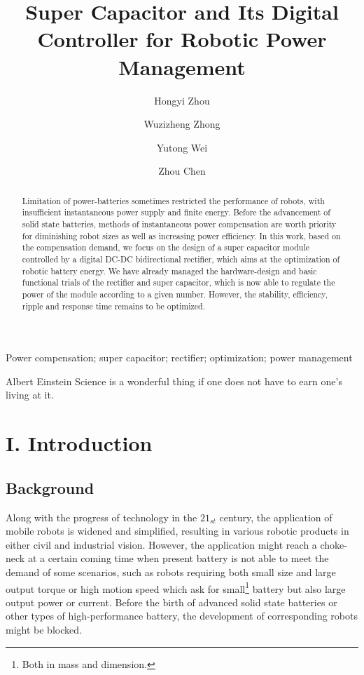 \documentclass[a4paper,num-refs]{oup-contemporary}
\title{Super Capacitor and Its Digital Controller for Robotic Power Management}
\author[1,\authfn{1}]{Hongyi Zhou}
\author[2,\authfn{1}]{Wuzizheng Zhong}
\author[2,\authfn{1}]{Yutong Wei}
\author[2,\authfn{1}]{Zhou Chen}
\affil[1]{Optoelectronic Engineering}
\affil[2]{Cybernetics Engineering}
\begin{document}
\begin{frontmatter}
\maketitle
\begin{abstract}
Limitation of power-batteries sometimes restricted the performance of robots, with insufficient instantaneous power supply and finite energy. Before the advancement of solid state batteries, methods of instantaneous power compensation are worth priority for diminishing robot sizes as well as increasing power efficiency. In this work, based on the compensation demand, we focus on the design of a super capacitor module controlled by a digital DC-DC bidirectional rectifier, which aims at the optimization of robotic battery energy. We have already managed the hardware-design and basic functional trials of the rectifier and super capacitor, which is now able to regulate the power of the module according to a given number. However, the stability, efficiency, ripple and response time remains to be optimized.
\end{abstract}

\begin{keywords}
Power compensation; super capacitor; rectifier; optimization; power management
\end{keywords}
\end{frontmatter}


\begin{epigraph}{Albert Einstein}
Science is a wonderful thing if one does not have to earn one's living at it.
\end{epigraph}


\section{I. Introduction}

\subsection{Background}

Along with the progress of technology in the $ 21_{st} $ century, the application of mobile robots is widened and simplified, resulting in various robotic products in either civil and industrial vision. However, the application might reach a choke-neck at a certain coming time when present battery is not able to meet the demand of some scenarios, such as robots requiring both small size and large output torque or high motion speed which ask for small\footnote{Both in mass and dimension.} battery but also large output power or current. Before the birth of advanced solid state batteries or other types of high-performance battery, the development of corresponding robots might be blocked. 
\end{document}
